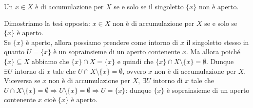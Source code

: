 \begin{es}
  Un $ x \in X $ è di accumulazione per $ X $ se e solo se il singoletto $ \{x\} $ non è aperto.
\end{es}
%
Dimostriamo la tesi opposta: $ x \in X $ non è di accumulazione per $ X $ se e solo se $ \{x\} $ è aperto. \\
Se $ \{x\} $ è aperto, allora possiamo prendere come intorno di $ x $ il singoletto stesso in quanto $ U = \{x\} $ è un soprainsieme di un aperto contenente $ x $. Ma allora poiché $ \{x\} \subseteq X $ abbiamo che $ \{x\} \cap X = \{x\} $ e quindi che $ \{x\} \cap X \setminus \{x\} = \emptyset $. Dunque $ \exists U \text{ intorno di } x $ tale che $ U \cap X \setminus \{x\} = \emptyset $, ovvero $ x $ non è di accumulazione per $ X $. Viceversa se $ x $ non è di accumulazione per $ X $, $ \exists U \text{ intorno di } x $ tale che $ U \cap X \setminus \{x\} = \emptyset \Rightarrow U \setminus \{x\} = \emptyset \Rightarrow U = \{x\} $: dunque $ \{x\} $ è soprainsieme di un aperto contenente $ x $ cioè $ \{x\} $ è aperto.

